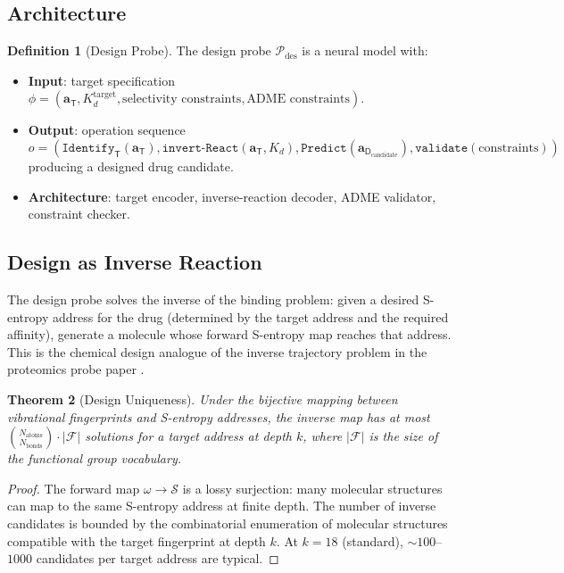 \documentclass[11pt,twocolumn,a4paper]{article}
\newtheorem{theorem}{Theorem}[section]
\theoremstyle{definition}
\newtheorem{definition}[theorem]{Definition}
\theoremstyle{remark}
\newcommand{\Sspace}{\mathcal{S}}
\newcommand{\probe}{\mathcal{P}}
\newcommand{\drugaddr}{\mathbf{a}_{\mathsf{D}}}
\newcommand{\targaddr}{\mathbf{a}_{\mathsf{T}}}
\begin{document}
\subsection{Architecture}

\begin{definition}[Design Probe]
\label{def:design_probe}
The design probe $\probe_{\mathrm{des}}$ is a neural model with:
\begin{itemize}[nosep,leftmargin=*]
\item \textbf{Input}: target specification $\phi = (\targaddr, K_d^{\mathrm{target}}, \text{selectivity constraints}, \text{ADME constraints})$.
\item \textbf{Output}: operation sequence
\begin{equation*}
o = (\texttt{Identify}_\mathsf{T}(\targaddr), \texttt{invert-React}(\targaddr, K_d), \texttt{Predict}(\drugaddr_{\mathrm{candidate}}), \texttt{validate}(\text{constraints}))
\end{equation*}
producing a designed drug candidate.
\item \textbf{Architecture}: target encoder, inverse-reaction decoder, ADME validator, constraint checker.
\end{itemize}
\end{definition}

\subsection{Design as Inverse Reaction}

The design probe solves the inverse of the binding problem: given a desired S-entropy address for the drug (determined by the target address and the required affinity), generate a molecule whose forward S-entropy map reaches that address. This is the chemical design analogue of the inverse trajectory problem in the proteomics probe paper \citep{sachikonye2025b}.

\begin{theorem}[Design Uniqueness]
\label{thm:design_uniqueness}
Under the bijective mapping between vibrational fingerprints and S-entropy addresses, the inverse map has at most $\binom{N_{\mathrm{atoms}}}{N_{\mathrm{bonds}}} \cdot |\mathcal{F}|$ solutions for a target address at depth $k$, where $|\mathcal{F}|$ is the size of the functional group vocabulary.
\end{theorem}

\begin{proof}
The forward map $\omega \to \Sspace$ is a lossy surjection: many molecular structures can map to the same S-entropy address at finite depth. The number of inverse candidates is bounded by the combinatorial enumeration of molecular structures compatible with the target fingerprint at depth $k$. At $k = 18$ (standard), $\sim\!100$--$1000$ candidates per target address are typical.
\end{proof}
\end{document}
